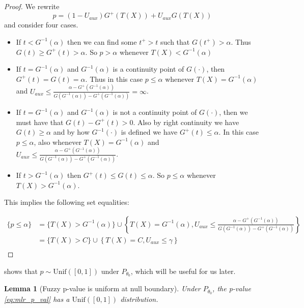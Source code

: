 \documentclass{article}
\newtheorem{lemma}{Lemma}
\begin{document}
\begin{appendix}
\begin{proof} We rewrite 
    \begin{equation*}
        p = (1 - U_{aux})G^+(T(X)) + U_{aux} G(T(X))
    \end{equation*}
    and consider four  cases. 
    \begin{itemize}
        \item If $t < G^{-1}(\alpha)$ then we can find some $t^+ > t$ such that $G(t^+) > \alpha$. Thus $G(t) \geq G^{+}(t) > \alpha$. So $p > \alpha$ whenever $T(X) < G^{-1}(\alpha)$ 
        \item If $t = G^{-1}(\alpha)$ and $G^{-1}(\alpha)$ is a continuity point of $G(\cdot)$, then $G^{+}(t) = G(t) = \alpha$. Thus in this case $p \leq \alpha$ whenever $T(X) = G^{-1}(\alpha)$ and $U_{aux} \leq  \frac{\alpha - G^+(G^{-1}(\alpha))}{G(G^{-1}(\alpha)) - G^+(G^{-1}(\alpha))} = \infty$. 
        \item If $t = G^{-1}(\alpha)$ and $G^{-1}(\alpha)$ is not a continuity point of $G(\cdot)$, then we must have that $G(t) - G^+(t)  > 0$. Also by right continuity we have $G(t) \geq \alpha$ and by how $G^{-1}(\cdot)$ is defined we have $G^+(t) \leq \alpha$. In this case $p \leq \alpha$, also whenever $T(X) = G^{-1}(\alpha)$ and $U_{aux} \leq  \frac{\alpha - G^+(G^{-1}(\alpha))}{G(G^{-1}(\alpha)) - G^+(G^{-1}(\alpha))}$. 
        \item If $t > G^{-1}(\alpha)$ then $G^+(t) \leq G(t) \leq \alpha$. So $p \leq \alpha$ whenever $T(X) > G^{-1}(\alpha)$. 
    \end{itemize}


    This implies the following set equalities:

    \begin{align*}
        \{p \leq \alpha \} &= \{T(X) > G^{-1}(\alpha) \} \cup \left\{T(X) =  G^{-1}(\alpha), U_{aux} \leq \frac{\alpha - G^+(G^{-1}(\alpha))}{G(G^{-1}(\alpha)) - G^+(G^{-1}(\alpha))} \right\}\\
                           &= \{T(X) > C \} \cup \left\{T(X) =  C, U_{aux} \leq \gamma \right\}\\
    \end{align*}

\end{proof}


 shows that $p \sim \text{Unif}([0, 1])$ under $P_{\theta_0}$, which will be useful for us later. 

\begin{lemma}[Fuzzy p-value is uniform at null boundary]
    \label{lem:uniform}
    Under $P_{\theta_0}$, the p-value \eqref{eq:mlr_p_val} has a $\text{Unif}([0, 1])$ distribution.
\end{lemma}


\end{appendix}
\end{document}
